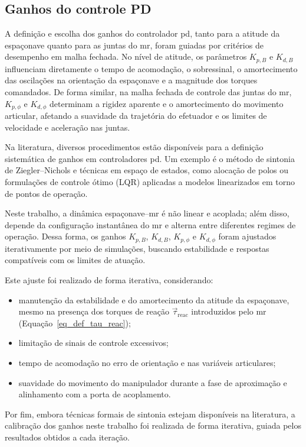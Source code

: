 \subsection{Ganhos do controle PD}
\label{sec:controlePD_ganhos}

A definição e escolha dos ganhos do controlador \gls{pd}, tanto para a atitude da espaçonave quanto para as juntas do \gls{mr}, foram guiadas por critérios de desempenho em malha fechada.
No nível de atitude, os parâmetros $K_{p,B}$ e $K_{d,B}$ influenciam diretamente o tempo de acomodação, o sobressinal, o amortecimento das oscilações na orientação da espaçonave e a magnitude dos torques comandados.
De forma similar, na malha fechada de controle das juntas do \gls{mr}, $K_{p,\phi}$ e $K_{d,\phi}$ determinam a rigidez aparente e o amortecimento do movimento articular, afetando a suavidade da trajetória do efetuador e os limites de velocidade e aceleração nas juntas.

Na literatura, diversos procedimentos estão disponíveis para a definição sistemática de ganhos em controladores \gls{pd}.
Um exemplo é o método de sintonia de Ziegler--Nichols \cite{ogata2010engenharia} e técnicas em espaço de estados, como alocação de polos ou formulações de controle ótimo (LQR) aplicadas a modelos linearizados em torno de pontos de operação.

Neste trabalho, a dinâmica espaçonave--\gls{mr} é não linear e acoplada; além disso, depende da configuração instantânea do \gls{mr} e alterna entre diferentes regimes de operação.
Dessa forma, os ganhos $K_{p,B}$, $K_{d,B}$, $K_{p,\phi}$ e $K_{d,\phi}$ foram ajustados iterativamente por meio de simulações, buscando estabilidade e respostas compatíveis com os limites de atuação.

Este ajuste foi realizado de forma iterativa, considerando:

\begin{itemize}
  \item manutenção da estabilidade e do amortecimento da atitude da espaçonave, mesmo na presença dos torques de reação $\vec\tau_{\text{reac}}$ introduzidos pelo \gls{mr} (Equação~\eqref{eq_def_tau_reac});
  \item limitação de sinais de controle excessivos;
  \item tempo de acomodação no erro de orientação e nas variáveis articulares;
  \item suavidade do movimento do manipulador durante a fase de aproximação e alinhamento com a porta de acoplamento.
\end{itemize}

Por fim, embora técnicas formais de sintonia estejam disponíveis na literatura, a calibração dos ganhos neste trabalho foi realizada de forma iterativa, guiada pelos resultados obtidos a cada iteração.
